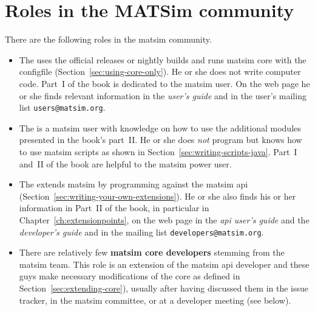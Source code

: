 \section{Roles in the MATSim community}
\label{sec:roles}
There are the following roles in the \gls{matsim} community.
%
\begin{itemize}\styleItemize
\item The  uses the official releases or nightly builds and runs \gls{matsim} core with the \gls{configfile} (Section~\ref{sec:using-core-only}). He or she does not write computer code. Part~I of the book is dedicated to the \gls{matsim} user. On the web page he or she finds relevant information in the \emph{user's guide} and in the user's mailing list \lstinline|users@matsim.org|.
%
\item The  is a \gls{matsim} user with knowledge on how to use the additional modules presented in the book's part~II. He or she does \emph{not} program but knows how to use \gls{matsim} scripts as shown in Section~\ref{sec:writing-scripts-java}. Part~I and~II of the book are helpful to the \gls{matsim} power user.
%
\item The  extends \gls{matsim} by programming against the \gls{matsim} \gls{api} (Section~\ref{sec:writing-your-own-extensions}). He or she also finds his or her information in Part~II of the book, in particular in Chapter~\ref{ch:extensionpoints}, on the web page in the \emph{\gls{api} user's guide} and the \emph{developer's guide} and in the mailing list \lstinline|developers@matsim.org|.
%
%
\item There are relatively few \textbf{\gls{matsim} core developers} stemming from the \gls{matsim} team. This role is an extension of the \gls{matsim} \gls{api} developer and these guys make necessary modifications of the core as defined in Section~\ref{sec:extending-core}), usually after having discussed them in the issue tracker, in the \gls{matsim} committee, or at a developer meeting (see below). 
%
\end{itemize}
%
